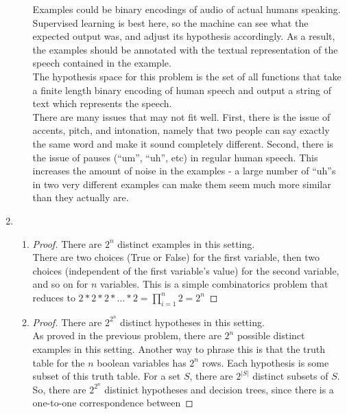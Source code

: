 \documentclass[12pt]{article}
\begin{document}
\begin{enumerate}
\begin{enumerate}
        Examples could be binary encodings of audio of actual humans speaking.
        Supervised learning is best here, so the machine can see what the expected
        output was, and adjust its hypothesis accordingly. As a result, the examples
        should be annotated with the textual representation of the speech contained
        in the example.\\

        The hypothesis space for this problem is the set of all functions that take a
        finite length binary encoding of human speech and output a string of text
        which represents the speech.\\

        There are many issues that may not fit well. First, there is the issue of accents,
        pitch, and intonation, namely that two people can say exactly the same word and make
        it sound completely different. Second, there is the issue of pauses (``um'', ``uh'', etc)
        in regular human speech. This increases the amount of noise in the examples - a large
        number of ``uh''s in two very different examples can make them seem much more similar
        than they actually are.
    \end{enumerate}
  \item
    \begin{enumerate}
      \item
        \begin{proof} There are $2^n$ distinct examples in this setting.\\
          There are two choices (True or False) for the first variable,
          then two choices (independent of the first variable's value) for
          the second variable, and so on for $n$ variables. This is a simple
          combinatorics problem that reduces to $2*2*2*...*2 = \prod_{i=1}^{n} 2 = 2^n$
        \end{proof}
      \item
        \begin{proof} There are $2^{2^n}$ distinct hypotheses in this setting.\\
          As proved in the previous problem, there are $2^n$ possible distinct
          examples in this setting. Another way to phrase this is that the truth
          table for the $n$ boolean variables has $2^n$ rows. Each hypothesis is
          some subset of this truth table. For a set $S$, there are $2^{|S|}$
          distinct subsets of $S$. So, there are $2^{2^n}$ distinict hypotheses
          and decision trees, since there is a one-to-one correspondence between

\end{proof}
\end{enumerate}
\end{enumerate}
\end{document}
